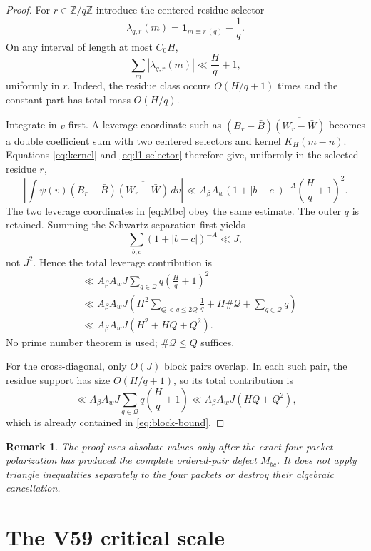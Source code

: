 \documentclass[11pt]{article}
\newtheorem{remark}[theorem]{Remark}
\newcommand{\Fq}{\mathbb Z/q\mathbb Z}
\newcommand{\one}{\mathbf 1}
\newcommand{\cQ}{\mathcal Q}
\begin{document}
\begin{proof}
For $r\in\Fq$ introduce the centered residue selector
\[
 \lambda_{q,r}(m)=\one_{m\equiv r\,(q)}-\frac1q.
\]
On any interval of length at most $C_0H$,
\begin{equation}\label{eq:l1-selector}
 \sum_m|\lambda_{q,r}(m)|\ll \frac Hq+1,
\end{equation}
uniformly in $r$.  Indeed, the residue class occurs $O(H/q+1)$ times and the
constant part has total mass $O(H/q)$.

Integrate in $v$ first.  A leverage coordinate such as
$(B_r-\bar B)\overline{(W_r-\bar W)}$ becomes a double coefficient sum with
two centered selectors and kernel $K_H(m-n)$.  Equations
\eqref{eq:kernel} and \eqref{eq:l1-selector} therefore give, uniformly in the
selected residue $r$,
\[
 \left|\int\psi(v)(B_r-\bar B)
 \overline{(W_r-\bar W)}\,dv\right|
 \ll A_\beta A_w(1+|b-c|)^{-A}\left(\frac Hq+1\right)^2.
\]
The two leverage coordinates in \eqref{eq:Mbc} obey the same estimate.  The
outer $q$ is retained.  Summing the Schwartz separation first yields
\[
 \sum_{b,c}(1+|b-c|)^{-A}\ll J,
\]
not $J^2$.  Hence the total leverage contribution is
\begin{align*}
 &\ll A_\beta A_w J
 \sum_{q\in\cQ}q\left(\frac Hq+1\right)^2\\
 &\ll A_\beta A_w J
 \left(H^2\sum_{Q<q\le2Q}\frac1q
 +H\#\cQ+\sum_{q\in\cQ}q\right)\\
 &\ll A_\beta A_w J(H^2+HQ+Q^2).
\end{align*}
No prime number theorem is used; $\#\cQ\le Q$ suffices.

For the cross-diagonal, only $O(J)$ block pairs overlap.  In each such pair,
the residue support has size $O(H/q+1)$, so its total contribution is
\[
 \ll A_\beta A_wJ\sum_{q\in\cQ}q\left(\frac Hq+1\right)
 \ll A_\beta A_wJ(HQ+Q^2),
\]
which is already contained in \eqref{eq:block-bound}.
\end{proof}

\begin{remark}
The proof uses absolute values only after the exact four-packet polarization
has produced the complete ordered-pair defect $M_{bc}$.  It does not apply
triangle inequalities separately to the four packets or destroy their
algebraic cancellation.
\end{remark}

\section{The V59 critical scale}
\end{document}
